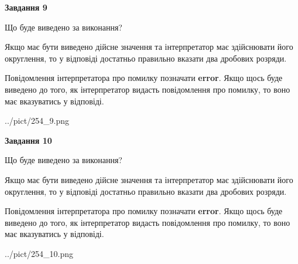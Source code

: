 \documentclass[12pt, ukrainian]{article}
\begin{document}
{\begin {Large}
{\begin {center}\textbf{Завдання 9}\end {center}}\par
Що буде виведено за виконання? \par

Якщо має бути виведено дійсне значення та інтерпретатор має здійснювати його округлення, 
то у відповіді достатньо правильно вказати два дробових розряди.

Повідомлення інтерпретатора про помилку позначати \textbf{error}.
Якщо щось буде виведено до того, як інтерпретатор видасть повідомлення про помилку, 
то воно має вказуватись у відповіді. \par

\begin{center}
	{../pict/254_9.png}
\end{center}
\newpage

{\begin {center}\textbf{Завдання 10}\end {center}}\par
Що буде виведено за виконання? \par

Якщо має бути виведено дійсне значення та інтерпретатор має здійснювати його округлення, 
то у відповіді достатньо правильно вказати два дробових розряди.

Повідомлення інтерпретатора про помилку позначати \textbf{error}.
Якщо щось буде виведено до того, як інтерпретатор видасть повідомлення про помилку, 
то воно має вказуватись у відповіді. \par

\begin{center}
	{../pict/254_10.png}
\end{center}
\newpage

\end {Large}}
\end{document}
